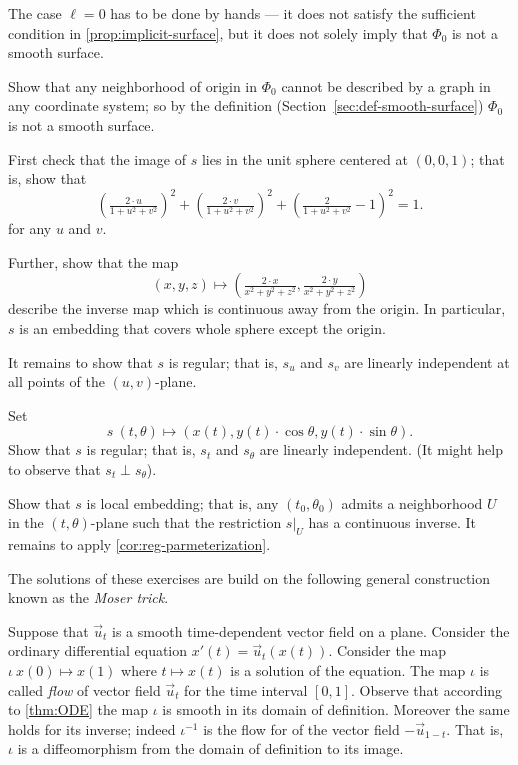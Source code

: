 The case $\ell=0$ has to be done by hands --- it does not satisfy the sufficient condition in \ref{prop:implicit-surface}, but it does not solely imply that $\Phi_0$ is not a smooth surface.

Show that any neighborhood of origin in $\Phi_0$ cannot be described by a graph in any coordinate system;
so by the definition (Section~\ref{sec:def-smooth-surface}) $\Phi_0$ is not a smooth surface.

First check that the image of $s$ lies in the unit sphere centered at $(0,0,1)$;
that is, show that 
\[\left(\tfrac{2\cdot u}{1+u^2+v^2}\right)^2
+
\left(\tfrac{2\cdot v}{1+u^2+v^2}\right)^2
+\left(\tfrac{2}{1+u^2+v^2}-1\right)^2=1.\]
for any $u$ and $v$.

Further, show that the map 
\[(x,y,z)\mapsto (\tfrac{2\cdot x}{x^2+y^2+z^2},\tfrac{2\cdot y}{x^2+y^2+z^2})\]
describe the inverse map which is continuous away from the origin.
In particular, $s$ is an embedding that covers whole sphere except the origin.

It remains to show that $s$ is regular; that is, $s_u$ and $s_v$ are linearly independent at all points of the $(u,v)$-plane.

Set
\[s\:(t,\theta)\mapsto (x(t), y(t)\cdot\cos\theta,y(t)\cdot\sin\theta).\]
Show that $s$ is regular; that is, $s_t$ and $s_\theta$ are linearly independent.
(It might help to observe that $s_t\perp s_\theta$).

Show that $s$ is local embedding; that is, any $(t_0,\theta_0)$ admits a neighborhood $U$ in the $(t,\theta)$-plane such that the restriction $s|_U$ has a continuous inverse.
It remains to apply \ref{cor:reg-parmeterization}.

The solutions of these exercises are build on the following general construction known as the \emph{Moser trick}.

Suppose that $\vec u_t$ is a smooth time-dependent vector field on a plane.
Consider the ordinary differential equation $x'(t)=\vec u_t(x(t))$.
Consider the map $\iota\:x(0)\mapsto x(1)$ where $t\mapsto x(t)$ is a solution of the equation.
The map $\iota$ is called \emph{flow} of vector field $\vec u_t$ for the time interval $[0,1]$.
Observe that according to \ref{thm:ODE} the map $\iota$ is smooth in its domain of definition.
Moreover the same holds for its inverse;
indeed $\iota^{-1}$ is the flow for of the vector field $-\vec u_{1-t}$.
That is, $\iota$ is a diffeomorphism from the domain of definition to its image. 


